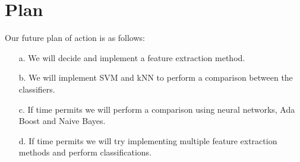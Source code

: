 \documentclass[11pt,twocolumn]{scrartcl}
\begin{document}
\section{Plan}
\label{sec:plan}
 Our future plan of action is as follows:
 \begin{itemize}
 \item[a.]We will decide and implement a feature extraction method.
 \item[b.]We will implement SVM and kNN to perform a comparison between the classifiers. 
 \item[c.]If time permits we will perform a comparison using neural networks, Ada Boost and Naive Bayes.
 \item[d.] If time permits we will try implementing multiple feature extraction methods and perform classifications.
 \end{itemize}



\end{document}
